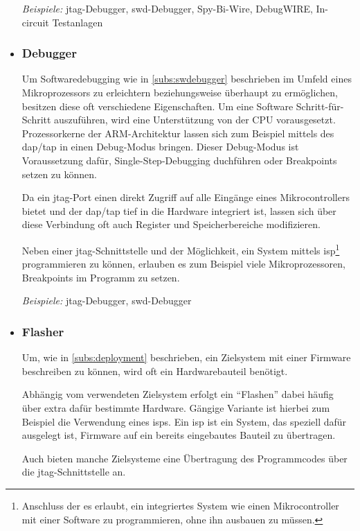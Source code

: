 \begin{itemize}
  \emph{Beispiele:} \gls{jtag}-Debugger, \gls{swd}-Debugger, Spy-Bi-Wire,
  DebugWIRE, In-circuit Testanlagen
  \item \subsubsection*{Debugger}\label{subs:hwdebugger}  Um
  Softwaredebugging wie in \autoref{subs:swdebugger} beschrieben im Umfeld eines
  Mikroprozessors zu erleichtern beziehungsweise überhaupt zu ermöglichen,
  besitzen diese oft verschiedene Eigenschaften.
  Um eine Software Schritt-für-Schritt auszuführen, wird eine Unterstützung von
  der CPU vorausgesetzt. Prozessorkerne der ARM-Architektur lassen sich zum
  Beispiel mittels des \gls{dap}/\gls{tap} in einen Debug-Modus bringen.
  Dieser Debug-Modus ist Voraussetzung dafür, Single-Step-Debugging duchführen
  oder Breakpoints setzen zu können.
  
  Da ein \gls{jtag}-Port einen direkt Zugriff auf alle Eingänge eines
  Mikrocontrollers bietet und der \gls{dap}/\gls{tap} tief in die Hardware
  integriert ist, lassen sich über diese Verbindung oft auch Register und
  Speicherbereiche modifizieren.
  
  Neben einer \gls{jtag}-Schnittstelle und der Möglichkeit, ein System mittels
  \gls{isp}\footnote{Anschluss der es erlaubt, ein
  integriertes System wie einen Mikrocontroller mit einer Software zu programmieren, ohne
  ihn ausbauen zu müssen.} programmieren zu können, erlauben es zum Beispiel
  viele Mikroprozessoren, Breakpoints im Programm zu setzen.
  
  \emph{Beispiele:} \gls{jtag}-Debugger, \gls{swd}-Debugger
  \item \subsubsection*{Flasher} Um, wie in \autoref{subs:deployment}
  beschrieben, ein Zielsystem mit einer Firmware beschreiben zu können, wird
  oft ein Hardwarebauteil benötigt.
  
  Abhängig vom verwendeten Zielsystem erfolgt ein "`Flashen"' dabei häufig über
  extra dafür bestimmte Hardware. Gängige Variante ist hierbei zum Beispiel die
  Verwendung eines \glspl{isp}. Ein \gls{isp} ist ein System, das speziell
  dafür ausgelegt ist, Firmware auf ein bereits eingebautes Bauteil zu übertragen.
  
  Auch bieten manche Zielsysteme eine Übertragung des Programmcodes über die
  \gls{jtag}-Schnittstelle an.
\end{itemize}
